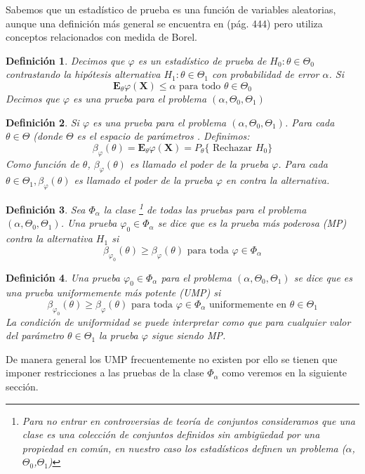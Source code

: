 \documentclass[peerreview]{IEEEtran}
\newtheorem{definition}{Definición}
\begin{document}
Sabemos que un estadístico de prueba es una función de variables aleatorias, aunque una definición más general se encuentra en \cite{Rohatgi} (pág. 444) pero utiliza conceptos relacionados con medida de Borel.
\begin{definition}
Decimos que $\varphi$ es un estadístico de prueba de $H_0: \theta \in \Theta_0$ contrastando la hipótesis alternativa $H_1 :\theta \in  \Theta_1$ con probabilidad de error $\alpha$. Si 
\[
\mathbf{E}_\theta \varphi(\mathbf{X}) \leq \alpha \textrm{  para todo  }\theta \in \Theta_0
\]
Decimos que $ \varphi$ es una prueba para el problema $(\alpha, \Theta_0, \Theta_1)$
\end{definition}
\begin{definition}
Si $\varphi$ es una prueba para el problema $(\alpha, \Theta_0, \Theta_1)$. Para cada $\theta \in \Theta$ (donde $\Theta$ es el espacio de parámetros . Definimos:
\[
\beta_\varphi(\theta)= \mathbf{E}_\theta \varphi (\mathbf{X}) = P_\theta\{ \textrm{ Rechazar }H_0\}
\]
Como función de $\theta$, $\beta_\varphi(\theta)$ es llamado el poder de la prueba $\varphi$. Para cada $\theta \in \Theta_1, \beta_\varphi(\theta)$ es llamado el poder de la prueba $\varphi$ en contra la alternativa.
\end{definition}
\begin{definition}
Sea $\Phi_\alpha$ la clase 
\footnote{
Para no entrar en controversias de teoría de conjuntos consideramos que una clase es una colección de conjuntos definidos sin ambigüedad por una propiedad en común, en nuestro caso los estadísticos definen un problema ($\alpha$, $\Theta_0$,$\Theta_1$)
} 
de todas las pruebas para el problema $(\alpha, \Theta_0, \Theta_1)$. Una prueba $\varphi_0 \in \Phi_\alpha$ se dice que es la prueba más poderosa (MP) contra la alternativa $H_1$ si 
\[
\beta_{\varphi_0}(\theta) \geq \beta_\varphi(\theta) \textrm{          para toda     }  \varphi \in \Phi_\alpha
\]
\end{definition}
\begin{definition}
 Una prueba $\varphi_0 \in \Phi_\alpha$ para el problema $(\alpha, \Theta_0, \Theta_1)$ se dice que es una prueba uniformemente más potente (UMP) si
\[
\beta_{\varphi_0}(\theta) \geq \beta_\varphi(\theta) \textrm{          para toda     }  \varphi \in \Phi_\alpha  \textrm{ uniformemente en } \theta \in \Theta_1
\]
La condición de uniformidad se puede interpretar como que para cualquier valor del parámetro $\theta \in \Theta_1$ la prueba $\varphi$ sigue siendo MP.
\end{definition}
De manera general los UMP frecuentemente no existen por ello se tienen que imponer restricciones a las pruebas de la clase $\Phi_\alpha$ como veremos en la siguiente sección. 
\end{document}
